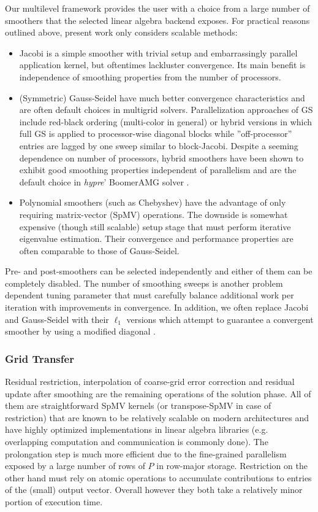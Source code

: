 Our multilevel framework provides the user with a choice from a large number of smoothers that the selected linear algebra backend exposes.   For practical reasons outlined above, present work only considers scalable methods:
\begin{itemize}
    \item Jacobi is a simple smoother with trivial setup and embarrassingly parallel application kernel, but oftentimes lackluster convergence.   Its main benefit is independence of smoothing properties from the number of processors.
    \item (Symmetric) Gauss-Seidel have much better convergence characteristics and are often default choices in multigrid solvers.    Parallelization approaches of GS include red-black ordering (multi-color in general) or hybrid versions in which full GS is applied to processor-wise diagonal blocks while ''off-processor'' entries are lagged by one sweep similar to block-Jacobi.   Despite a seeming dependence on number of processors, hybrid smoothers have been shown to exhibit good smoothing properties independent of parallelism \cite{Baker2011} and are the default choice in \textit{hypre}' BoomerAMG solver \cite{Henson2002}.
    \item Polynomial smoothers (such as Chebyshev) have the advantage of only requiring matrix-vector (SpMV) operations.   The downside is somewhat expensive (though still scalable) setup stage that must perform iterative eigenvalue estimation.   Their convergence and performance properties are often comparable to those of Gauss-Seidel.
\end{itemize}
Pre- and post-smoothers can be selected independently and either of them can be completely disabled.   The number of smoothing sweeps is another problem dependent tuning parameter that must carefully balance additional work per iteration with improvements in convergence.   In addition, we often replace Jacobi and Gauss-Seidel with their $\ell_1$ versions which attempt to guarantee a convergent smoother by using a modified diagonal \cite{Baker2011}.

\subsubsection{Grid Transfer}
\label{subsec:par_kernels_apply_transfer}

Residual restriction, interpolation of coarse-grid error correction and residual update after smoothing are the remaining operations of the solution phase.   All of them are straightforward SpMV kernels (or transpose-SpMV in case of restriction) that are known to be relatively scalable on modern architectures and have highly optimized implementations in linear algebra libraries (e.g. overlapping computation and communication is commonly done).   The prolongation step is much more efficient due to the fine-grained parallelism exposed by a large number of rows of $P$ in row-major storage.   Restriction on the other hand must rely on atomic operations to accumulate contributions to entries of the (small) output vector.   Overall however they both take a relatively minor portion of execution time.

